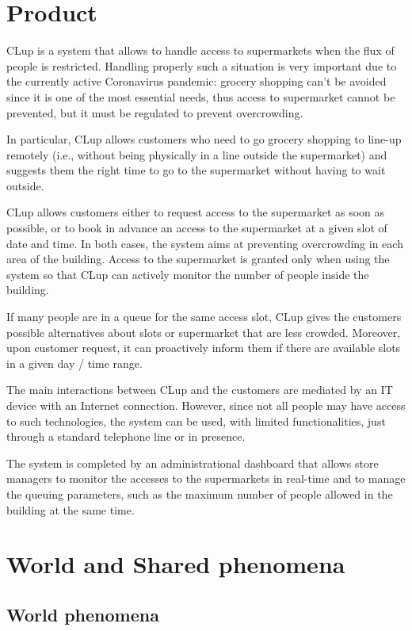 \documentclass[../../main.tex]{subfiles}
\begin{document}
\section{Product}

CLup is a system that allows to handle access to supermarkets when the flux of
people is restricted. Handling properly such a situation is very important due
to the currently active Coronavirus pandemic: grocery shopping can't be avoided
since it is one of the most essential needs, thus access to supermarket cannot
be prevented, but it must be regulated to prevent overcrowding.

In particular, CLup allows customers who need to go grocery shopping to line-up
remotely (i.e., without being physically in a line outside the supermarket) and
suggests them the right time to go to the supermarket without having to wait
outside.

CLup allows customers either to request access to the supermarket as soon as
possible, or to book in advance an access to the supermarket at a given slot of
date and time. In both cases, the system aims at preventing overcrowding in each
area of the building. Access to the supermarket is granted only when using the
system so that CLup can actively monitor the number of people inside the
building.

If many people are in a queue for the same access slot, CLup gives the customers
possible alternatives about slots or supermarket that are less crowded.
Moreover, upon customer request, it can proactively inform them if there are
available slots in a given day / time range.

The main interactions between CLup and the customers are mediated by an IT
device with an Internet connection. However, since not all people may have
access to such technologies, the system can be used, with limited
functionalities, just through a standard telephone line or in presence.

The system is completed by an administrational dashboard that allows store
managers to monitor the accesses to the supermarkets in real-time and to manage
the queuing parameters, such as the maximum number of people allowed in the
building at the same time.

\section{World and Shared phenomena}

\subsection{World phenomena}
\end{document}
